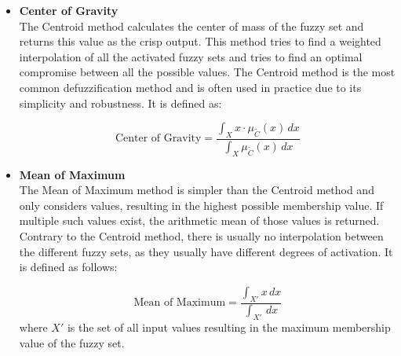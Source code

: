 \begin{itemize}
      \item \textbf{Center of Gravity} \\
            The Centroid method calculates the center of mass of the fuzzy set and returns this value as the crisp output. This method tries to find a weighted interpolation of all the activated fuzzy sets and tries to find an optimal compromise between all the possible values. The Centroid method is the most common defuzzification method and is often used in practice due to its simplicity and robustness. It is defined as:

            \begin{equation}
                  \text{Center of Gravity} = \frac{\int_X x \cdot \mu_{\tilde{C}}(x) \, dx}{\int_X \mu_{\tilde{C}}(x) \, dx}
            \end{equation}

      \item \textbf{Mean of Maximum} \\
            The Mean of Maximum method is simpler than the Centroid method and only considers values, resulting in the highest possible membership value. If multiple such values exist, the arithmetic mean of those values is returned. Contrary to the Centroid method, there is usually no interpolation between the different fuzzy sets, as they usually have different degrees of activation. It is defined as follows:

            \begin{equation}
                  \text{Mean of Maximum} = \frac{\int_{X'} x \, dx}{\int_{X'}  \, dx}
            \end{equation}
            where $X'$ is the set of all input values resulting in the maximum membership value of the fuzzy set.
\end{itemize}
